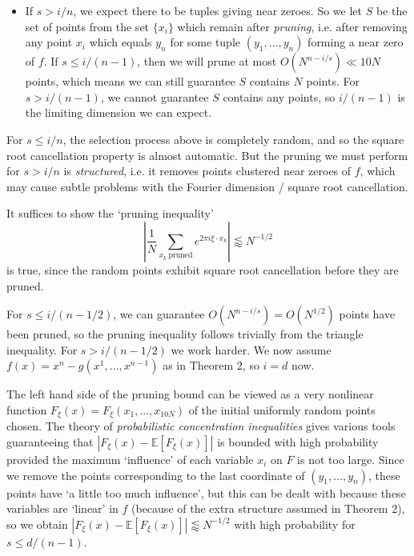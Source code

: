 \documentclass[12pt]{article}
\numberwithin{equation}{section}
\theoremstyle{plain}
\theoremstyle{remark}
\newcommand{\newpart}[1]
{\colorbox[rgb]{0.97,0.92,0.7}{\makebox[0.97\columnwidth]
{\rule[-1.2ex]{0pt}{3.7ex}\partfont{#1}}}\bigskip}
\newcommand{\partfont}[1]{{\Large \textsf{\textbf{#1}}}}
\begin{document}
{{\begin{multicols}{2}
{\begin{itemize}
    \item If $s > i/n$, we expect there to be tuples giving near zeroes. So we let $S$ be the set of points from the set $\{ x_i \}$ which remain after \emph{pruning}, i.e. after removing any point $x_i$ which equals $y_n$ for some tuple $(y_1,\dots,y_n)$ forming a near zero of $f$. If $s \leq i/(n-1)$, then we will prune at most $O(N^{n-i/s}) \ll 10 N$ points, which means we can still guarantee $S$ contains $N$ points. For $s > i/(n-1)$, we cannot guarantee $S$ contains any points, so $i/(n-1)$ is the limiting dimension we can expect.
\end{itemize}
%
For $s \leq i/n$, the selection process above is completely random, and so the square root cancellation property is almost automatic. But the pruning we must perform for $s > i/n$ is \emph{structured}, i.e. it removes points clustered near zeroes of $f$, which may cause subtle problems with the Fourier dimension / square root cancellation.

}



\columnbreak

\newpart{Dealing With Pruning}

\large{
It suffices to show the `pruning inequality'
    \[ \left| \frac{1}{N} \sum_{x_k\ \text{pruned}} e^{2 \pi i \xi \cdot x_k} \right| \lessapprox N^{-1/2} \]
%
is true, since the random points exhibit square root cancellation before they are pruned.

\vspace{0.1cm}

For $s \leq i/(n-1/2)$, we can guarantee $O(N^{n-i/s}) = O(N^{1/2})$ points have been pruned, so the pruning inequality follows trivially from the triangle inequality. For $s > i/(n-1/2)$ we work harder. We now assume $f(x) = x^n - g(x^1,\dots,x^{n-1})$ as in Theorem 2, so $i = d$ now.

\vspace{0.1cm}

The left hand side of the pruning bound can be viewed as a very nonlinear function $F_\xi(x) = F_\xi(x_1,\dots,x_{10N})$ of the initial uniformly random points chosen. The theory of \emph{probabilistic concentration inequalities} gives various tools guaranteeing that $|F_\xi(x) - \mathbb{E}[F_\xi(x)]|$ is bounded with high probability provided the maximum `influence' of each variable $x_i$ on $F$ is not too large. Since we remove the points corresponding to the last coordinate of $(y_1,\dots,y_n)$, these points have `a little too much influence', but this can be dealt with because these variables are `linear' in $f$ (because of the extra structure assumed in Theorem 2), so we obtain $|F_\xi(x) - \mathbb{E}[F_\xi(x)]| \lessapprox N^{-1/2}$ with high probability for $s \leq d/(n-1)$.

}
\end{multicols}}}
\end{document}
